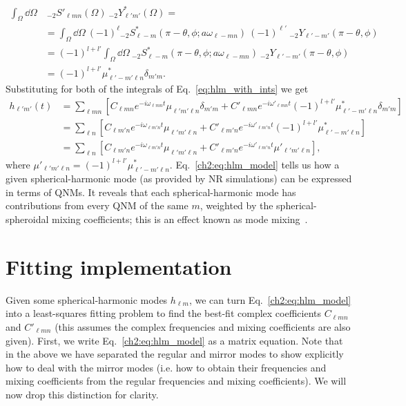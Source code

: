 \begin{align}
    \int_\Omega \dd{\Omega}& ~ {}_{-2}S'_{\ell m n}(\Omega) ~ {}_{-2}Y^*_{\ell' m'}(\Omega) = \nonumber \\ 
    &= \int_\Omega \dd{\Omega} ~ (-1)^\ell {}_{-2}S^*_{\ell -m}(\pi - \theta, \phi; a\omega_{\ell -m n}) ~ (-1)^{\ell'} ~ {}_{-2}Y_{\ell' -m'}(\pi - \theta, \phi) \nonumber \\
    &= (-1)^{l+l'} \int_\Omega \dd{\Omega} ~ {}_{-2}S^*_{\ell -m}(\pi - \theta, \phi; a\omega_{\ell -m n}) ~ {}_{-2}Y_{\ell' -m'}(\pi - \theta, \phi) \nonumber \\
    &= (-1)^{l+l'} \mu^*_{\ell' -m' \ell n} \delta_{m' m}.
\end{align}
Substituting for both of the integrals of Eq.~\ref{eq:hlm_with_ints} we get
\begin{align}\label{ch2:eq:hlm_model}
    h_{\ell' m'}(t) &= \sum_{\ell m n} \left[ C_{\ell m n} e^{-i \omega_{\ell m n} t} \mu_{\ell' m' \ell n} \delta_{m' m} + C'_{\ell m n} e^{-i \omega'_{\ell m n} t} (-1)^{l+l'} \mu^*_{\ell' -m' \ell n} \delta_{m' m} \right] \nonumber \\
    &= \sum_{\ell n} \left[ C_{\ell m' n} e^{-i \omega_{\ell m' n} t} \mu_{\ell' m' \ell n} + C'_{\ell m' n} e^{-i \omega'_{\ell m' n} t} (-1)^{l+l'} \mu^*_{\ell' -m' \ell n} \right] \nonumber \\
    &= \sum_{\ell n} \left[ C_{\ell m' n} e^{-i \omega_{\ell m' n} t} \mu_{\ell' m' \ell n} + C'_{\ell m' n} e^{-i \omega'_{\ell m' n} t} \mu'_{\ell' m' \ell n} \right],
\end{align}
where $\mu'_{\ell' m' \ell n} = (-1)^{l+l'} \mu^*_{\ell' -m' \ell n}$.
Eq.~\ref{ch2:eq:hlm_model} tells us how a given spherical-harmonic mode (as provided by NR simulations) can be expressed in terms of QNMs. 
It reveals that each spherical-harmonic mode has contributions from every QNM of the same $m$, weighted by the spherical-spheroidal mixing coefficients; this is an effect known as mode mixing~\cite{Berti:2014fga}.

\section{Fitting implementation}
\label{ch2:sec:fitting}

Given some spherical-harmonic modes $h_{\ell m}$, we can turn Eq.~\ref{ch2:eq:hlm_model} into a least-squares fitting problem to find the best-fit complex coefficients $C_{\ell m n}$ and $C'_{\ell m n}$ (this assumes the complex frequencies and mixing coefficients are also given). 
First, we write Eq.~\ref{ch2:eq:hlm_model} as a matrix equation. 
Note that in the above we have separated the regular and mirror modes to show explicitly how to deal with the mirror modes (i.e. how to obtain their frequencies and mixing coefficients from the regular frequencies and mixing coefficients). 
We will now drop this distinction for clarity.

